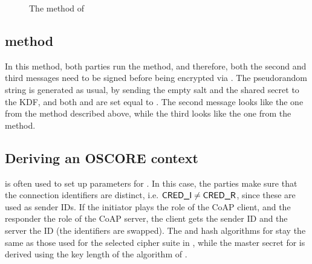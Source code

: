 \begin{figure}[!h]
{}
\caption{The \mStatSig method of \mEdhoc}
\label{fig:edhocstatsig}
\end{figure}

\subsection{\mSigSig method}
In this method, both parties run the \mSig method, and therefore, both the second and third messages need to be signed before being encrypted via \mAead. The pseudorandom string \mPRKtwo is generated as usual, by sending the empty salt and the shared secret to the KDF, and both \mPRKthree and \mPRKfour are set equal to \mPRKtwo. The second message looks like the one from the \mSigStat method described above, while the third looks like the one from the \mStatSig method.

\subsection{Deriving an OSCORE context}
\mEdhoc is often used to set up parameters for \mOscore. In this case, the parties make sure that the connection identifiers are distinct, i.e. $\text{\textup{\textsf{CRED\_I}}} \neq \text{\textup{\textsf{CRED\_R}}}$, since these are used as \mOscore sender IDs. If the initiator plays the role of the CoAP client, and the responder the role of the CoAP server, the client gets the sender ID \mCredr and the server the ID \mCredi (the identifiers are swapped). The \mAead and hash algorithms for \mOscore stay the same as those used for the selected cipher suite in \mEdhoc, while the master secret for \mOscore is derived using the key length of the \mAead algorithm of \mEdhoc. 

